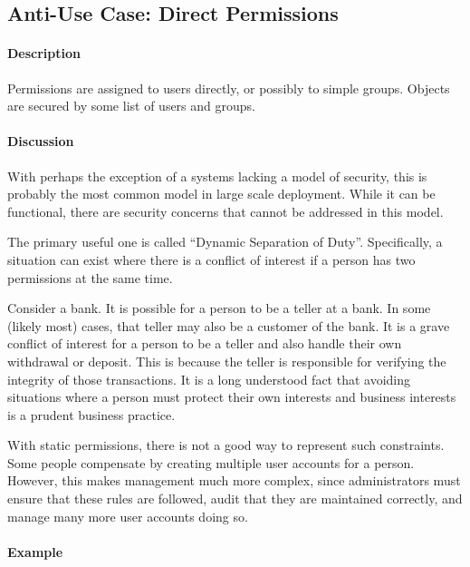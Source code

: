 \subsection{Anti-Use Case: Direct Permissions}

\paragraph{Description}

Permissions are assigned to users directly, or possibly to simple groups.  Objects are secured by some list of users and groups.

\paragraph{Discussion}

With perhaps the exception of a systems lacking a model of security, this is probably the most common model in large scale deployment.  While it can be functional, there are security concerns that cannot be addressed in this model.

The primary useful one is called ``Dynamic Separation of Duty''.  Specifically, a situation can exist where there is a conflict of interest if a person has two permissions at the same time.

Consider a bank.  It is possible for a person to be a teller at a bank.  In some (likely most) cases, that teller may also be a customer of the bank.  It is a grave conflict of interest for a person to be a teller and also handle their own withdrawal or deposit.  This is because the teller is responsible for verifying the integrity of those transactions.  It is a long understood fact that avoiding situations where a person must protect their own interests and business interests is a prudent business practice.

With static permissions, there is not a good way to represent such constraints.  Some people compensate by creating multiple user accounts for a person.  However, this makes management much more complex, since administrators must ensure that these rules are followed, audit that they are maintained correctly, and manage many more user accounts doing so.

\paragraph{Example}

